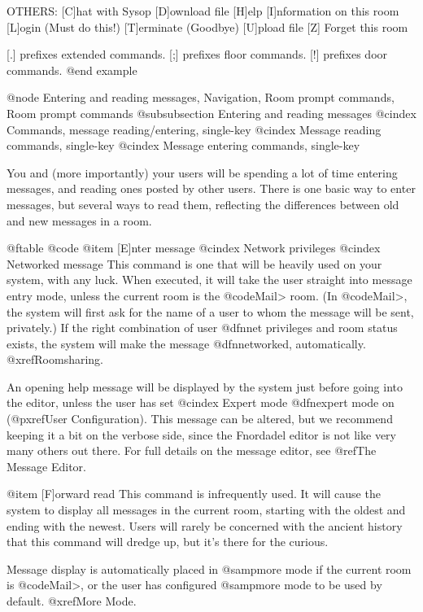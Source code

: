OTHERS:
[C]hat with Sysop
[D]ownload file
[H]elp
[I]nformation on this room
[L]ogin (Must do this!)
[T]erminate (Goodbye)
[U]pload file
[Z] Forget this room

[.] prefixes extended commands.
[;] prefixes floor commands.
[!] prefixes door commands.
@end example

@node Entering and reading messages, Navigation, Room prompt commands, Room prompt commands
@subsubsection Entering and reading messages
@cindex Commands, message reading/entering, single-key
@cindex Message reading commands, single-key
@cindex Message entering commands, single-key

You and (more importantly) your users will be spending a lot of time entering
messages, and reading ones posted by other users.  There is one basic way to enter
messages, but several ways to read them, reflecting the differences between old and
new messages in a room.

@ftable @code
@item [E]nter message
@cindex Network privileges
@cindex Networked message
This command is one that will be heavily used on your system,
with any luck.  When executed, it will take the user straight into
message entry mode, unless the current room is the @code{Mail>} room.  (In
@code{Mail>}, the system will first ask for the name of a user to whom the
message will be sent, privately.)  If the right combination of user
@dfn{net privileges} and room status exists, the system will make the message
@dfn{networked}, automatically.  @xref{Roomsharing}.

An opening help message will be displayed by the system
just before going into the editor, unless the user has set
@cindex Expert mode
@dfn{expert mode} on (@pxref{User Configuration}).  This message can be altered,
but we recommend keeping it a bit on the verbose side, since
the Fnordadel editor is not like very many others out there.  For full
details on the message editor, see @ref{The Message Editor}.

@item [F]orward read
This command is infrequently used.  It will cause the system to display
all messages in the current room, starting with the oldest and ending with
the newest.  Users will rarely be concerned with the ancient history that
this command will dredge up, but it's there for the curious.

Message display is automatically placed in @samp{more} mode if the current
room is @code{Mail>}, or the user has configured @samp{more} mode to be used
by default.  @xref{More Mode}.

